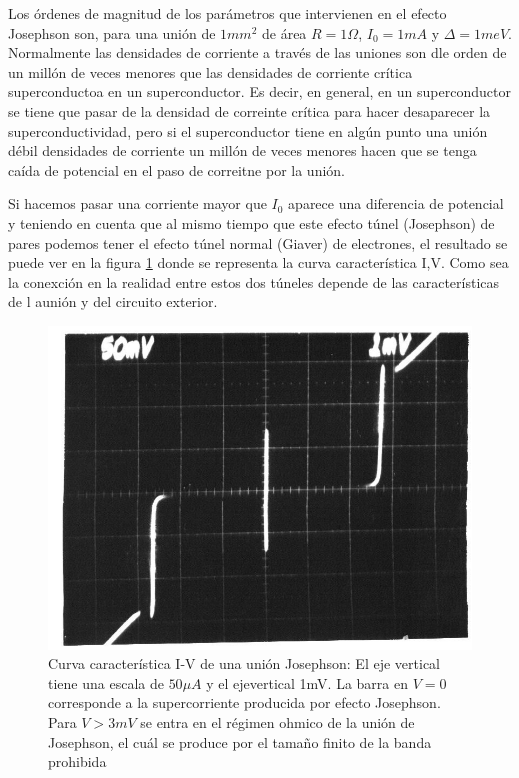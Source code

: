 Los órdenes de magnitud de los parámetros que intervienen en el efecto Josephson son, para una unión de $1mm^2$ de área $R = 1 \Omega$, $I_0 = 1 mA$ y $\Delta = 1meV$. Normalmente las densidades de corriente a través de las uniones son dle orden de un millón de veces menores que las densidades de corriente crítica superconductoa en un superconductor. Es decir, en general, en un superconductor se tiene que pasar de la densidad de correinte crítica para hacer desaparecer la superconductividad, pero si el superconductor tiene en algún punto una unión débil densidades de corriente un millón de veces menores hacen que se tenga caída de potencial en el paso de correitne por la unión.

Si hacemos pasar una corriente mayor que $I_0$ aparece una diferencia de potencial y teniendo en cuenta que al mismo tiempo que este efecto túnel (Josephson) de pares podemos tener el efecto túnel normal (Giaver) de electrones, el resultado se puede ver en la figura \ref{fig:ivjj} donde se representa la curva característica I,V. Como sea la conexción en la realidad entre estos dos túneles depende de las características de l aunión y del circuito exterior.

\begin{figure}[H]
\centering \includegraphics[width=0.8\linewidth]{img/IVJJ.JPG}
\caption[Curva característica I-V de una unión Josephson]{Curva característica I-V de una unión Josephson: El eje vertical tiene una escala de $50\mu A$ y el ejevertical 1mV. La barra en $V=0$ corresponde a la supercorriente producida por efecto Josephson. Para $V > 3mV$ se entra en el régimen ohmico de la unión de Josephson, el cuál se produce por el tamaño finito de la banda prohibida}
\label{fig:ivjj}
\end{figure}

